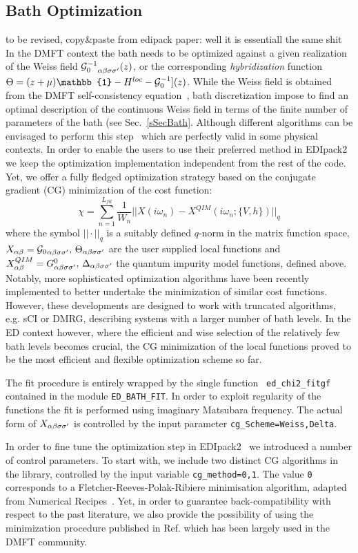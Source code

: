 \documentclass[preprint,3p,10pt]{elsarticle}
\newcommand{\onlinecite}[1]{\nocite{#1}\hspace{-0.1cm}\citenum{#1}}
\newcommand{\secu}[1]
{Sec.~\ref{#1}}
\def\a{\alpha}       \def\b{\beta}   \def\g{\gamma}   \def\d{\delta}
\def\GG{{\cal G}} \def\SS{{\cal S}}
\def\11{\mathbb{1}}
\def\NAME{{\rm EDIpack2 }}
\begin{document}
\subsection{Bath Optimization}\label{sSecFit}
{\color{red} to be revised, copy\&paste from edipack paper: well it is
  essentiall the same shit} 
In the DMFT context the bath needs to be optimized
against a given realization of the Weiss field
${\GG^{-1}_{0}}_{\a\b\s\s'}(z)$, or the corresponding {\it hybridization} function
$\Theta = (z + \mu)\11 - H^{loc} -\GG_0^{-1}](z)$. While the Weiss
field is obtained from the DMFT self-consistency
equation~\cite{Georges1996RMP}, bath discretization impose to  find an optimal
description of the continuous Weiss field in terms of the finite
number of parameters of the bath (see \secu{sSecBath}.
Although different algorithms can be envisaged to perform this
step~\cite{Garcia2004PRL,Taranto2012PRB} which are perfectly valid in
some physical contexts.
In order to enable the users to use their preferred 
method in \NAME we keep the optimization implementation independent
from the rest of the code. Yet, we offer a fully fledged optimization
strategy based on the  conjugate gradient (CG) minimization of the cost function:
$$
\chi = \sum_{n=1}^{L_{fit}}\frac{1}{W_n}||X(i\omega_n) - X^{QIM}(i\omega_n;\{V,h\})||_q
$$
where the symbol $|| \cdot ||_q$ is a suitably defined $q$-norm in the
matrix function space, $X_{\a\b}={\GG_{0}}_{\a\b\s\s'},\,\Theta_{\a\b\s\s'}$ are the user
supplied local functions and
$X_{\a\b}^{QIM}=G^0_{\a\b\s\s'},\,\Delta_{\a\b\s\s'}$ the
quantum impurity model functions, defined above.
Notably, more sophisticated optimization algorithms have been
recently implemented to better undertake the minimization of similar
cost functions. However, these developments are designed to work with truncated
algorithms, e.g. sCI or DMRG, describing systems with a larger number of
bath levels.   
In the ED context however, where the efficient and wise selection of
the relatively few bath levels becomes crucial, the CG minimization of
the local functions proved to be the most efficient and
flexible optimization scheme so far. 

The fit procedure is entirely wrapped by the single function {\tt
  ed\_chi2\_fitgf} contained in the module \texttt{ED\_BATH\_FIT}.   
In order to exploit regularity of the functions the fit is 
performed using imaginary Matsubara frequency. 
The actual form of $X_{\a\b\s\s'}$ is controlled by the input parameter
\texttt{cg\_Scheme=Weiss,Delta}. 

In order to fine tune the optimization step in \NAME\ we
introduced a number of control parameters. To start with, we include
two distinct CG algorithms in the library, controlled by the input variable
\texttt{cg\_method=0,1}. The value \texttt{0} corresponds to a
Fletcher-Reeves-Polak-Ribiere minimisation algorithm, adapted from
Numerical Recipes~\cite{NumRec77}. Yet, in order to guarantee
back-compatibility with respect to the past literature, we also provide the
possibility of using the minimization procedure published in
Ref.\onlinecite{Georges1996RMP} which has been largely used in the DMFT
community.
\end{document}
